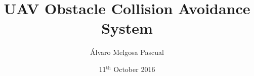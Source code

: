 \documentclass[9pt]{beamer}
\title[UAV Obstacle Collision Avoidance System]{UAV Obstacle Collision Avoidance System}
\author{Álvaro Melgosa Pascual} %
\institute[UC3M]{Universidad Carlos III Madrid, Leganés}
\date{ 11$^\text{th}$ October 2016} %
\begin{document}
\begin{frame}
\titlepage
\end{frame}
\end{document}
